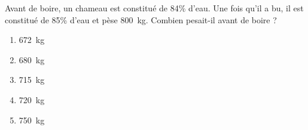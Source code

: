 Avant de boire, un chameau est constitué de 84\% d'eau. Une fois qu'il a bu, il est constitué de 85\% d'eau et pèse 800~kg. Combien pesait-il avant de boire ?
\begin{multicols}{5}
  \begin{enumerate}[A/]
  \item 672~kg
  \item 680~kg
  \item 715~kg
  \item 720~kg
  \item 750~kg
  \end{enumerate}
\end{multicols}